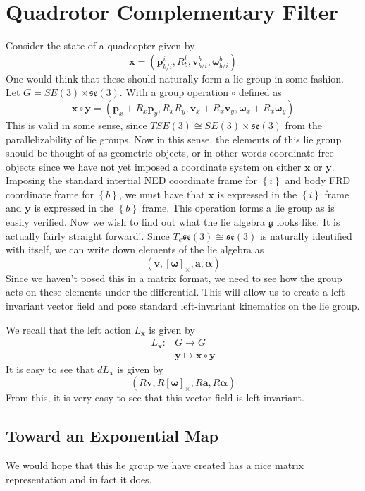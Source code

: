 \documentclass[a4paper]{article}
\begin{document}
\section*{Quadrotor Complementary Filter}
Consider the state of a quadcopter given by
\[
  \mathbf{x} = (\mathbf{p}_{b/i}^i, R_b^i, \mathbf{v}_{b/i}^b, \bm{\omega}_{b/i}^b)
\]
One would think that these should naturally form a lie group in some fashion. Let $G = SE(3) \rtimes \mathfrak{se}(3)$. With a group operation $\circ$ defined as
\[
  \mathbf{x} \circ \mathbf{y} = (\mathbf{p}_x + R_x\mathbf{p}_y, R_xR_y, \mathbf{v}_x + R_x\mathbf{v}_y, \bm{\omega}_x + R_x \bm{\omega}_y)
\]
This is valid in some sense, since $TSE(3) \cong SE(3) \times \mathfrak{se}(3)$ from the parallelizability of lie groups. Now in this sense, the elements of this lie group should be thought of as geometric objects, or in other words coordinate-free objects since we have not yet imposed a coordinate system on either $\mathbf{x}$ or $\mathbf{y}$. Imposing the standard intertial NED coordinate frame for $\left\{ i \right\}$ and body FRD coordinate frame for $\left\{ b \right\}$, we must have that $\mathbf{x}$ is expressed in the $\left\{ i \right\}$ frame and $\mathbf{y}$ is expressed in the $\left\{ b \right\}$ frame. This operation forms a lie group as is easily verified. Now we wish to find out what the lie algebra $\mathfrak{g}$ looks like. It is actually fairly straight forward!. Since $T_e\mathfrak{se}(3) \cong \mathfrak{se}(3)$ is naturally identified with itself, we can write down elements of the lie algebra as
\[
  (\mathbf{v}, \left[ \bm{\omega} \right]_\times, \mathbf{a}, \bm{\alpha})
\]
Since we haven't posed this in a matrix format, we need to see how the group acts on these elements under the differential. This will allow us to create a left invariant vector field and pose standard left-invariant kinematics on the lie group.

We recall that the left action $L_{\mathbf{x}}$ is given by
\[
  \begin{aligned}
    L_{\mathbf{x}}: &G \rightarrow G \\
                  &\mathbf{y} \mapsto \mathbf{x} \circ \mathbf{y}
  \end{aligned}
\]
It is easy to see that $dL_{\mathbf{x}}$ is given by
\[
  (R \mathbf{v}, R \left[\bm{\omega}\right]_\times, R \mathbf{a}, R\bm{\alpha})
\]
From this, it is very easy to see that this vector field is left invariant.

\subsection*{Toward an Exponential Map}%
We would hope that this lie group we have created has a nice matrix representation and in fact it does.
\end{document}
